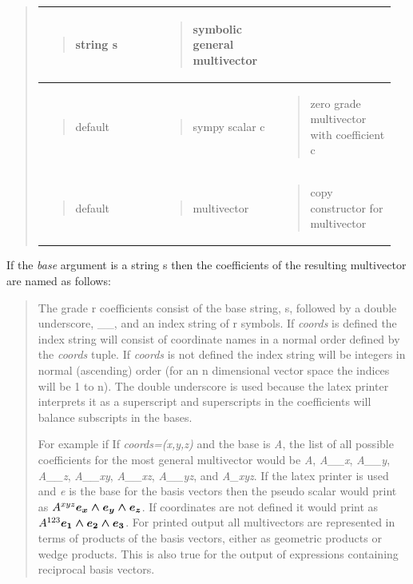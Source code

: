 \documentclass[letterpaper,10pt,english]{sphinxmanual}
\begin{document}
\begin{fulllineitems}
\begin{quote}
\begin{tabular}{|p{0.317\linewidth}|p{0.317\linewidth}|p{0.317\linewidth}|}
\begin{quote}
string s
\end{quote}
 & \begin{quote}

symbolic general multivector
\end{quote}
\\\hline
\begin{quote}

default
\end{quote}
 & \begin{quote}

sympy scalar c
\end{quote}
 & \begin{quote}

zero grade multivector with coefficient c
\end{quote}
\\\hline
\begin{quote}

default
\end{quote}
 & \begin{quote}

multivector
\end{quote}
 & \begin{quote}

copy constructor for multivector
\end{quote}
\\\hline
\end{tabular}

\end{quote}

If the \emph{base} argument is a string s then the coefficients of the resulting
multivector are named as follows:
\begin{quote}

The grade r coefficients consist of the base string, s, followed by a double
underscore, \_\_, and an index string of r symbols.  If \emph{coords} is defined the
index string will consist of coordinate names in a normal order defined by
the \emph{coords} tuple.  If \emph{coords} is not defined the index string will be
integers in normal (ascending) order (for an n dimensional vector space the
indices will be 1 to n).  The double underscore is used because the latex printer
interprets it as a superscript and superscripts in the coefficients will balance
subscripts in the bases.

For example if If \emph{coords=(x,y,z)} and the base is \emph{A}, the list of all possible
coefficients for the most general multivector would be \emph{A}, \emph{A\_\_x}, \emph{A\_\_y}, \emph{A\_\_z},
\emph{A\_\_xy}, \emph{A\_\_xz}, \emph{A\_\_yz}, and \emph{A\_xyz}.  If the latex printer is used and \emph{e} is the
base for the basis vectors then the pseudo scalar would print as
$A^{xyz}\boldsymbol{e_{x}\wedge e_{y}\wedge e_{z}}$. If coordinates are not defined it would print
as $A^{123}\boldsymbol{e_{1}\wedge e_{2}\wedge e_{3}}$.  For printed output all multivectors are represented
in terms of products of the basis vectors, either as geometric products or wedge products. This
is also true for the output of expressions containing reciprocal basis vectors.
\end{quote}


\end{fulllineitems}
\end{document}
